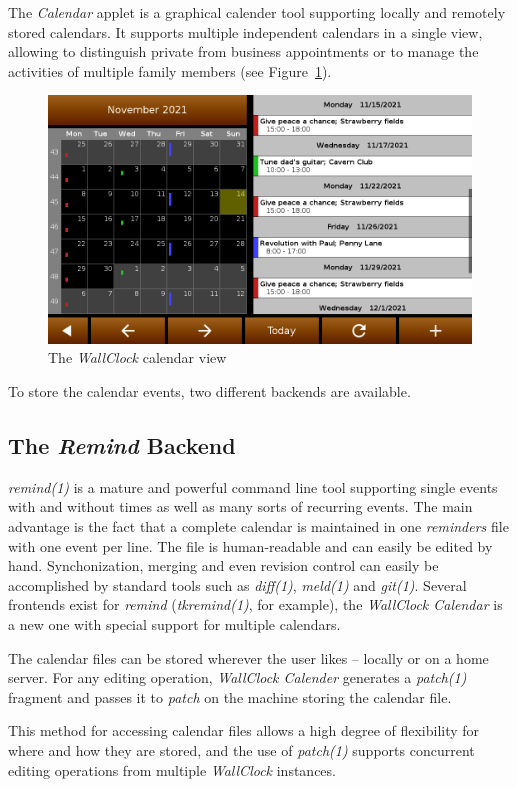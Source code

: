 \documentclass[12pt,english,parskip=half,headheight=19pt]{scrreprt}
\begin{document}
The \textit{Calendar} applet is a graphical calender tool supporting
locally and remotely stored calendars. It supports multiple independent
calendars in a single view, allowing to distinguish private from
business appointments or to manage the activities of multiple family
members (see Figure~\ref{fig:wallclock-calendar}).

\begin{figure}[ht]
  \centering
  \includegraphics[width=0.7\linewidth]{figs/wallclock-calendar.png}
  \caption[l]{The \textit{WallClock} calendar view}
  \label{fig:wallclock-calendar}
\end{figure}

To store the calendar events, two different backends are available.


\subsection{The \textit{Remind} Backend}

\textit{remind(1)} is a mature and powerful command line tool
supporting single events with and without times as well as
many sorts of recurring events. The main advantage is the fact that a
complete calendar is maintained in one \textit{reminders} file with one
event per line. The file is human-readable and can easily be
edited by hand. Synchonization, merging and even
revision control can easily be accomplished by standard tools such as
\textit{diff(1)}, \textit{meld(1)} and \textit{git(1)}.
Several frontends exist for \textit{remind} (\textit{tkremind(1)}, for example),
the \textit{WallClock Calendar} is a new one with special support for multiple
calendars.

The calendar files can be stored wherever the user likes -- locally or on
a home server.
For any editing operation, \textit{WallClock Calender} generates a \textit{patch(1)}
fragment and passes it to \textit{patch} on the machine storing the calendar file.

This method for accessing calendar files allows a high degree of flexibility
for where and how they are stored, and the use of \textit{patch(1)} supports
concurrent editing operations from multiple \textit{WallClock} instances.
\end{document}
